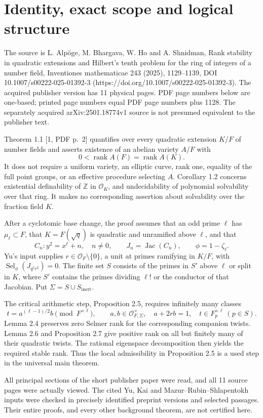 \documentclass[10pt]{article}
\begin{document}
\section*{Identity, exact scope and logical structure}
The source is L. Alpöge, M. Bhargava, W. Ho and A. Shnidman, Rank stability in quadratic extensions and Hilbert’s tenth problem for the ring of integers of a number field, Inventiones mathematicae 243 (2025), 1129–1139, DOI 10.1007/s00222-025-01392-3 (https://doi.org/10.1007/s00222-025-01392-3). The acquired publisher version has 11 physical pages. PDF page numbers below are one-based; printed page numbers equal PDF page numbers plus 1128. The separately acquired arXiv:2501.18774v1 source is not presumed equivalent to the publisher text.\par
Theorem 1.1 [1, PDF p. 2] quantifies over every quadratic extension \(K/F\) of number fields and asserts existence of an abelian variety \(A/F\) with \[0<\operatorname{rank}A(F)=\operatorname{rank}A(K).\] It does not require a uniform variety, an elliptic curve, rank one, equality of the full point groups, or an effective procedure selecting \(A\). Corollary 1.2 concerns existential definability of \(\mathbb Z\) in \(\mathcal O_K\), and undecidability of polynomial solvability over that ring. It makes no corresponding assertion about solvability over the fraction field \(K\).\par
After a cyclotomic base change, the proof assumes that an odd prime \(\ell\) has \(\mu_\ell\subset F\), that \(K=F(\sqrt q)\) is quadratic and unramified above \(\ell\), and that \[C_n:y^2=x^\ell+n,\quad n\ne0,\qquad J_n=\operatorname{Jac}(C_n),
 \qquad \phi=1-\zeta_\ell.\] Yu’s input supplies \(r\in\mathcal O_F\setminus\{0\}\), a unit at primes ramifying in \(K/F\), with \(\operatorname{Sel}_\phi(J_{q^\ell r^2})=0\). The finite set \(S\) consists of the primes in \(S'\) above \(\ell\) or split in \(K\), where \(S'\) contains the primes dividing \(\ell!\) or the conductor of that Jacobian. Put \(\Sigma=S\cup S_{\mathrm{inert}}\).\par
The critical arithmetic step, Proposition 2.5, requires infinitely many classes \[t=a^{(\ell-1)/2}b\pmod{F^{\times\ell}},\qquad
 a,b\in\mathcal O_{F,\Sigma}^{\times},\quad a+2rb=1,
 \quad t\in F_{ p}^{\times\ell}\ ( p\in S).\] Lemma 2.4 preserves zero Selmer rank for the corresponding companion twists. Lemma 2.6 and Proposition 2.7 give positive rank on all but finitely many of their quadratic twists. The rational eigenspace decomposition then yields the required stable rank. Thus the local admissibility in Proposition 2.5 is a used step in the universal main theorem.\par
All principal sections of the short publisher paper were read, and all 11 source pages were actually viewed. The cited Yu, Kai and Mazur–Rubin–Shlapentokh inputs were checked in precisely identified preprint versions and selected passages. Their entire proofs, and every other background theorem, are not certified here.\par
\end{document}

